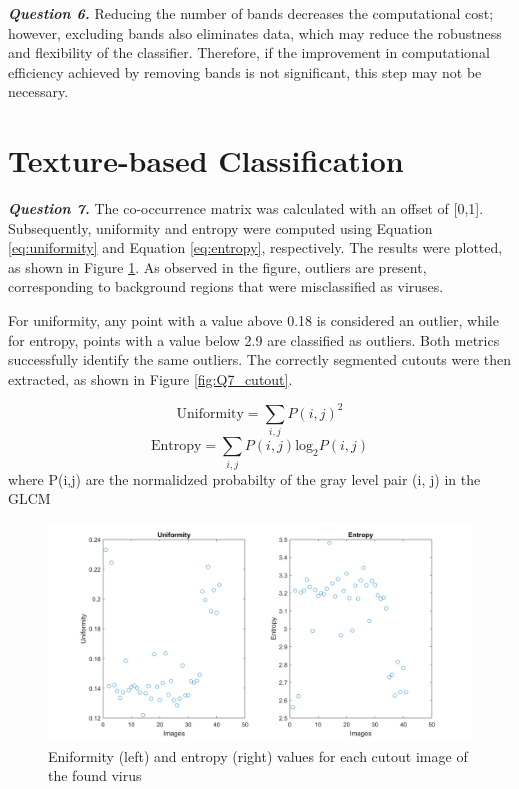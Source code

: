 \documentclass[12pt]{article}
\begin{document}
\textbf{\emph{Question 6.}}
Reducing the number of bands decreases the computational cost; however, excluding bands also eliminates data, which may reduce the robustness and flexibility of the classifier. Therefore, if the improvement in computational efficiency achieved by removing bands is not significant, this step may not be necessary.
\section{Texture-based Classification}
\textbf{\emph{Question 7.}}
The co-occurrence matrix was calculated with an offset of [0,1]. Subsequently, uniformity and entropy were computed using Equation \ref{eq:uniformity} and Equation \ref{eq:entropy}, respectively. The results were plotted, as shown in Figure \ref{fig:Q7_graph}. As observed in the figure, outliers are present, corresponding to background regions that were misclassified as viruses.

For uniformity, any point with a value above 0.18 is considered an outlier, while for entropy, points with a value below 2.9 are classified as outliers. Both metrics successfully identify the same outliers. The correctly segmented cutouts were then extracted, as shown in Figure \ref{fig:Q7_cutout}.

\begin{equation}
  \text{Uniformity} = \sum_{i,j} P(i,j)^2
  \label{eq:uniformity}
\end{equation}
\begin{equation}
  \text{Entropy} = \sum_{i,j} P(i,j) \text{log}_2 P(i,j)
  \label{eq:entropy}
\end{equation}
where P(i,j) are the normalidzed probabilty of the gray level pair (i, j) in the GLCM

\begin{figure}[h!]
  \centering
  \includegraphics[width = 15cm]{images/Q7_graph.png}
  \caption{Eniformity (left) and entropy (right) values for each cutout image of the found virus }
  \label{fig:Q7_graph}
\end{figure}
\end{document}
